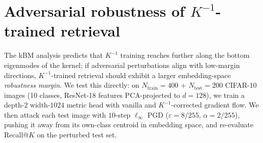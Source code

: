 \documentclass{article}
\begin{document}
\section{Adversarial robustness of $K^{-1}$-trained retrieval}
\label{app:adv}

The kBM analysis predicts that $K^{-1}$ training reaches further along
the bottom eigenmodes of the kernel; if adversarial perturbations align
with low-margin directions, $K^{-1}$-trained retrieval should exhibit a
larger embedding-space \emph{robustness margin}. We test this directly:
on $N_{\mathrm{train}}=400$ + $N_{\mathrm{test}}=200$ CIFAR-10 images
(10 classes, ResNet-18 features PCA-projected to $d=128$), we train a
depth-$2$ width-$1024$ metric head with vanilla and $K^{-1}$-corrected
gradient flow. We then attack each test image with $10$-step
$\ell_\infty$ PGD ($\varepsilon = 8/255$, $\alpha = 2/255$), pushing it
away from its own-class centroid in embedding space, and re-evaluate
Recall@$K$ on the perturbed test set.

\begin{table}[!htbp]
\centering
\small
\caption{Adversarial Recall@$K$ before and after pixel-space PGD
($\ell_\infty$, $\varepsilon = 8/255$, $\alpha = 2/255$, 10 steps),
mean over 5 seeds. Both methods reach near-chance R@$1$ under attack
(unsurprising given the strong attack budget); the predicted
embedding-space robustness margin shows up at $K\geq 10$, where
$K^{-1}$ retains \textbf{$5.7\times$} more recall at R@$10$ and
\textbf{$4.3\times$} more at R@$20$ than vanilla. The
robustness gap grows monotonically with $K$, exactly the bottom-
eigenmode-margin signature predicted by the kBM analysis.}
\label{tab:adv}
\end{table}
\end{document}
